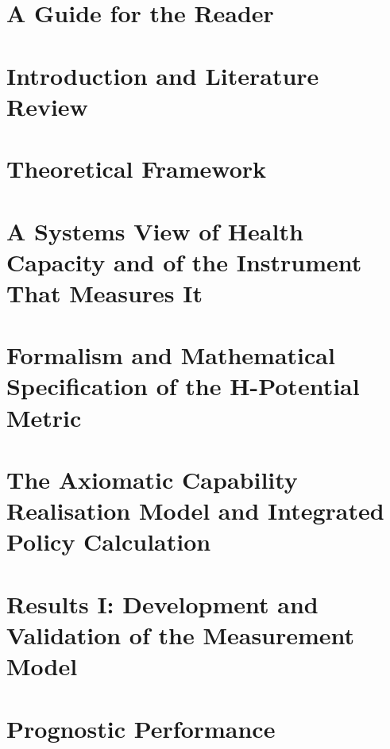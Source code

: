 \documentclass{wits} %
\begin{document}


\chapter*{A Guide for the Reader}


\chapter{Introduction and Literature Review}


\chapter{Theoretical Framework}\label{ch:literature}


\chapter{A Systems View of Health Capacity and of the Instrument That Measures It}\label{ch:systems}


\chapter{Formalism and Mathematical Specification of the H-Potential Metric}\label{chap:validation}


\chapter{The Axiomatic Capability Realisation Model and Integrated Policy Calculation}\label{chap:crf}


\chapter{Results I: Development and Validation of the Measurement Model}


\chapter{Prognostic Performance} \label{chap:dynamical_model}

\end{document}
